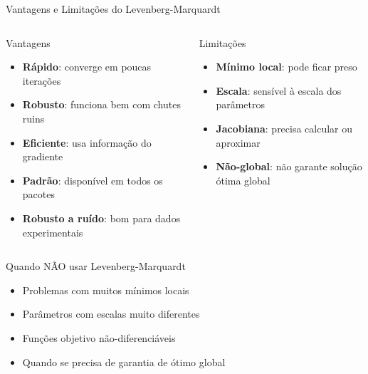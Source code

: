 \begin{frame}{Vantagens e Limitações do Levenberg-Marquardt}
\begin{columns}
\begin{block}{Vantagens}
\begin{itemize}
    \item \textbf{Rápido}: converge em poucas iterações
    \item \textbf{Robusto}: funciona bem com chutes ruins
    \item \textbf{Eficiente}: usa informação do gradiente
    \item \textbf{Padrão}: disponível em todos os pacotes
    \item \textbf{Robusto a ruído}: bom para dados experimentais
\end{itemize}
\end{block}

\begin{block}{Limitações}
\begin{itemize}
    \item \textbf{Mínimo local}: pode ficar preso
    \item \textbf{Escala}: sensível à escala dos parâmetros
    \item \textbf{Jacobiana}: precisa calcular ou aproximar
    \item \textbf{Não-global}: não garante solução ótima global
\end{itemize}
\end{block}
\end{columns}

\vspace{0.4cm}
\begin{block}{Quando NÃO usar Levenberg-Marquardt}
\begin{itemize}
    \item Problemas com muitos mínimos locais
    \item Parâmetros com escalas muito diferentes
    \item Funções objetivo não-diferenciáveis
    \item Quando se precisa de garantia de ótimo global
\end{itemize}
\end{block}
\end{frame}

